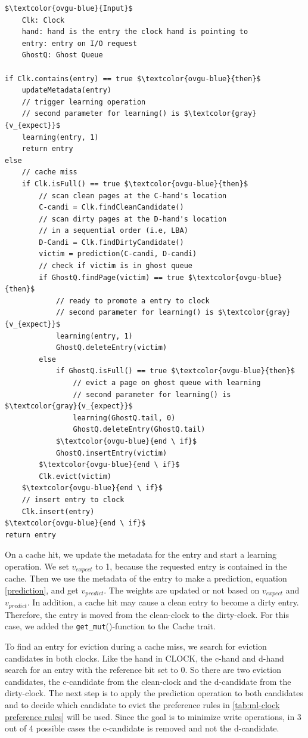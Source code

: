 \documentclass[
	12pt,
	a4paper,
	abstract,
	bibliography=totoc,
	chapterprefix,
	headings=openright,
	numbers=endperiod,
	parskip=half,
	twoside,
]{scrreprt}
\begin{document}
\begin{lstlisting}[mathescape=true,caption={ML-CLOCK replacement algorithm in pseudocode, slightly modified from \cite{jiang2005clock}},label=lst:ml-clock-algorithm]
$\textcolor{ovgu-blue}{Input}$
	Clk: Clock
	hand: hand is the entry the clock hand is pointing to
	entry: entry on I/O request
	GhostQ: Ghost Queue

if Clk.contains(entry) == true $\textcolor{ovgu-blue}{then}$
	updateMetadata(entry)
	// trigger learning operation
	// second parameter for learning() is $\textcolor{gray}{v_{expect}}$
	learning(entry, 1)
	return entry
else
	// cache miss
	if Clk.isFull() == true $\textcolor{ovgu-blue}{then}$
		// scan clean pages at the C-hand's location
		C-candi = Clk.findCleanCandidate()
		// scan dirty pages at the D-hand's location
		// in a sequential order (i.e, LBA)
		D-Candi = Clk.findDirtyCandidate()
		victim = prediction(C-candi, D-candi)
		// check if victim is in ghost queue
		if GhostQ.findPage(victim) == true $\textcolor{ovgu-blue}{then}$
			// ready to promote a entry to clock
			// second parameter for learning() is $\textcolor{gray}{v_{expect}}$
			learning(entry, 1)
			GhostQ.deleteEntry(victim)
		else
			if GhostQ.isFull() == true $\textcolor{ovgu-blue}{then}$
				// evict a page on ghost queue with learning
				// second parameter for learning() is $\textcolor{gray}{v_{expect}}$
				learning(GhostQ.tail, 0)
				GhostQ.deleteEntry(GhostQ.tail)
			$\textcolor{ovgu-blue}{end \ if}$
			GhostQ.insertEntry(victim)
		$\textcolor{ovgu-blue}{end \ if}$
		Clk.evict(victim)
	$\textcolor{ovgu-blue}{end \ if}$
	// insert entry to clock
	Clk.insert(entry)
$\textcolor{ovgu-blue}{end \ if}$
return entry 
\end{lstlisting}

On a cache hit, we update the metadata for the entry and start a learning operation.
We set $v_{expect}$ to 1, because the requested entry is contained in the cache.
Then we use the metadata of the entry to make a prediction, equation \ref{prediction}, and get $v_{predict}$.
The weights are updated or not based on $v_{expect}$ and $v_{predict}$.
In addition, a cache hit may cause a clean entry to become a dirty entry.
Therefore, the entry is moved from the clean-clock to the dirty-clock.
For this case, we added the \texttt{get\_mut}()-function to the Cache trait.

To find an entry for eviction during a cache miss, 
we search for eviction candidates in both clocks.
Like the hand in CLOCK, the c-hand and d-hand search for an entry with the reference bit set to 0.
So there are two eviction candidates, the c-candidate from the clean-clock and the d-candidate from the dirty-clock.
The next step is to apply the prediction operation to both candidates and to decide which candidate to evict the preference 
rules in \cref{tab:ml-clock preference rules} will be used.
Since the goal is to minimize write operations, in 3 out of 4 possible cases the c-candidate is removed and not the d-candidate.
\end{document}
